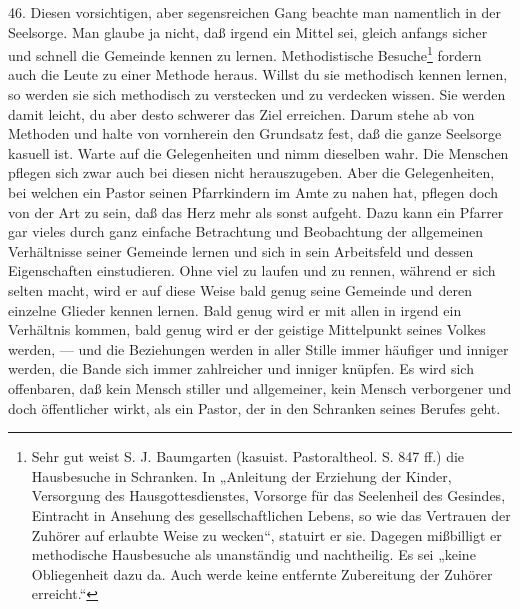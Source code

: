 46. Diesen vorsichtigen, aber segensreichen Gang beachte
man namentlich in der Seelsorge. Man glaube ja nicht, daß irgend ein Mittel sei, gleich anfangs sicher und schnell die Gemeinde kennen zu lernen. Methodistische Besuche\footnote{Sehr gut weist S. J. Baumgarten (kasuist. Pastoraltheol. S. 847 ff.) die Hausbesuche in Schranken. In „Anleitung der Erziehung der Kinder, Versorgung des Hausgottesdienstes, Vorsorge für das Seelenheil des Gesindes, Eintracht in Ansehung des gesellschaftlichen Lebens, so wie das Vertrauen der Zuhörer auf erlaubte Weise zu wecken“, statuirt er sie. Dagegen mißbilligt er methodische Hausbesuche als unanständig und nachtheilig. Es sei „keine Obliegenheit dazu da. Auch werde keine entfernte Zubereitung der Zuhörer erreicht.“} fordern auch die Leute zu einer Methode heraus. Willst du sie methodisch kennen lernen, so werden sie sich methodisch zu verstecken und zu verdecken wissen. Sie werden damit leicht, du aber desto schwerer das Ziel erreichen. Darum stehe ab von Methoden und halte von vornherein den Grundsatz fest, daß die ganze Seelsorge kasuell ist. Warte auf die Gelegenheiten und nimm dieselben wahr. Die Menschen pflegen sich zwar auch bei diesen nicht herauszugeben. Aber die Gelegenheiten, bei welchen ein Pastor seinen Pfarrkindern im Amte zu nahen hat, pflegen doch von der Art zu sein, daß das Herz mehr als sonst aufgeht. Dazu kann ein Pfarrer gar vieles durch ganz einfache Betrachtung und Beobachtung der allgemeinen Verhältnisse seiner Gemeinde lernen und sich in sein Arbeitsfeld und dessen Eigenschaften einstudieren. Ohne viel zu laufen und zu rennen, während er sich selten macht, wird er auf diese Weise bald genug
seine Gemeinde und deren einzelne Glieder kennen lernen. Bald genug wird er mit allen in irgend ein Verhältnis kommen, bald genug wird er der geistige Mittelpunkt seines Volkes werden, — und die Beziehungen werden in aller Stille immer häufiger und inniger werden, die Bande sich immer zahlreicher und inniger knüpfen. Es wird sich offenbaren, daß kein Mensch stiller und allgemeiner, kein Mensch verborgener und doch öffentlicher wirkt, als ein Pastor, der in den Schranken seines Berufes geht.

